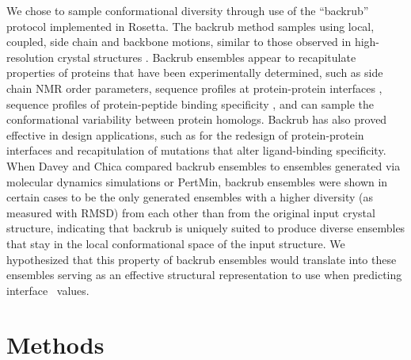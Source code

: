 We chose to sample conformational diversity through use of the ``backrub'' protocol implemented in Rosetta.
The backrub method samples using local, coupled, side chain and backbone motions, similar to those observed in high-resolution crystal structures \cite{davis_backrub_2006}.
Backrub ensembles appear to recapitulate properties of proteins that have been experimentally determined, such as side chain NMR order parameters\cite{friedland_simple_2008}, sequence profiles at protein-protein interfaces \cite{humphris_prediction_2008}, sequence profiles of protein-peptide binding specificity \cite{smith_structure-based_2010,smith_predicting_2011}, and can sample the conformational variability between protein homologs\cite{schenkelberg_protein_2016}.
Backrub has also proved effective in design applications, such as for the redesign of protein-protein interfaces\cite{kapp_control_2012} and recapitulation of mutations that alter ligand-binding specificity\cite{ollikainen_coupling_2015}.
When Davey and Chica compared backrub ensembles to ensembles generated via molecular dynamics simulations or PertMin\cite{davey_improving_2014}, backrub ensembles were shown in certain cases to be
the only generated ensembles with a higher diversity (as measured with RMSD) from each other than from the original input crystal structure, indicating that backrub is uniquely suited to produce diverse ensembles that stay in the local conformational space of the input structure.\cite{davey_improving_2014}
We hypothesized that this property of backrub ensembles would translate into these ensembles serving as an effective structural representation to use when predicting interface \ddg\ values.

\section{Methods}

